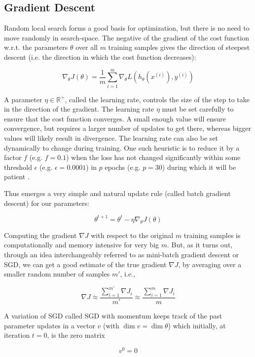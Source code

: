 \subsection{Gradient Descent}

Random local search forms a good basis for optimization, but there is no need to move randomly in search-space. The negative of the gradient of the cost function w.r.t. the parameters $\theta$ over all $m$ training samples gives the direction of steepest descent (i.e. the direction in which the cost function decreases):

$$
\nabla_{\theta} J(\theta) = \frac{1}{m} \sum_{i=1}^{m} \nabla_{\theta} L(h_{\theta}(x^{(i)}), y^{(i)})
$$

A parameter $\eta \in \mathbb{{R}^{+}}$, called the learning rate, controls the size of the step to take in the direction of the gradient. The learning rate $\eta$ must be set carefully to ensure that the cost function converges. A small enough value will ensure convergence, but requires a larger number of updates to get there, whereas bigger values will likely result in divergence. The learning rate can also be set dynamically to change during training. One such heuristic is to reduce it by a factor $f$ (e.g. $f=0.1$) when the loss has not changed significantly within some threshold $\epsilon$ (e.g. $\epsilon=0.0001$) in $p$ epochs (e.g. $p=30$) during which it will be patient \cite{learningrateschedules}.

Thus emerges a very simple and natural update rule (called batch gradient descent) for our parameters:

$$
\theta^{t+1} = \theta^t - \eta \nabla_{\theta} J(\theta)
$$

Computing the gradient $\nabla J$ with respect to the original $m$ training samples is computationally and memory intensive for very big $m$. But, as it turns out, through an idea interchangeably referred to as mini-batch gradient descent or \ac{SGD}, we can get a good estimate of the true gradient $\nabla J$, by averaging over a smaller random number of samples $m'$, i.e.,

$$
\nabla J \approx \frac{\sum_{i=1}^{m'} \nabla J_i}{m'} \approx \frac{\sum_{i=1}^m \nabla J_{i}}{m}
$$

A variation of \ac{SGD} called \ac{SGD} with momentum \cite{ruder2016} keeps track of the past parameter updates in a vector $v$ (with $\dim v = \dim \theta$) which initially, at iteration $t = 0$, is the zero matrix

$$
v^0 = 0
$$

